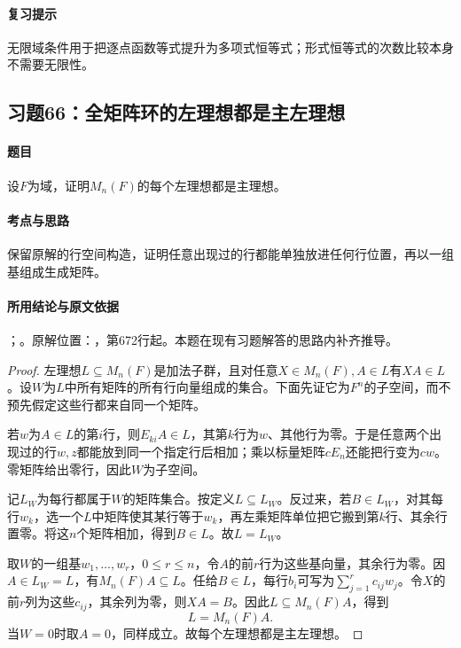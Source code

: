 \paragraph{复习提示}

无限域条件用于把逐点函数等式提升为多项式恒等式；形式恒等式的次数比较本身不需要无限性。



\subsection{习题66：全矩阵环的左理想都是主左理想}

\label{ex:3:66}

\paragraph{题目}

设$F$为域，证明$M_n(F)$的每个左理想都是主理想。

\paragraph{考点与思路}

保留原解的行空间构造，证明任意出现过的行都能单独放进任何行位置，再以一组基组成生成矩阵。

\paragraph{所用结论与原文依据}

；。原解位置：，第672行起。本题在现有习题解答的思路内补齐推导。


\begin{proof}

左理想$L\subseteq M_n(F)$是加法子群，且对任意$X\in M_n(F),A\in L$有$XA\in L$。设$W$为$L$中所有矩阵的所有行向量组成的集合。下面先证它为$F^n$的子空间，而不预先假定这些行都来自同一个矩阵。

若$w$为$A\in L$的第$i$行，则$E_{ki}A\in L$，其第$k$行为$w$、其他行为零。于是任意两个出现过的行$w,z$都能放到同一个指定行后相加；乘以标量矩阵$cE_n$还能把行变为$cw$。零矩阵给出零行，因此$W$为子空间。

记$L_W$为每行都属于$W$的矩阵集合。按定义$L\subseteq L_W$。反过来，若$B\in L_W$，对其每行$w_k$，选一个$L$中矩阵使其某行等于$w_k$，再左乘矩阵单位把它搬到第$k$行、其余行置零。将这$n$个矩阵相加，得到$B\in L$。故$L=L_W$。

取$W$的一组基$w_1,\ldots,w_r$，$0\le r\le n$，令$A$的前$r$行为这些基向量，其余行为零。因$A\in L_W=L$，有$M_n(F)A\subseteq L$。任给$B\in L$，每行$b_i$可写为$\sum_{j=1}^r c_{ij}w_j$。令$X$的前$r$列为这些$c_{ij}$，其余列为零，则$XA=B$。因此$L\subseteq M_n(F)A$，得到
\[
L=M_n(F)A.
\]
当$W=0$时取$A=0$，同样成立。故每个左理想都是主左理想。

\end{proof}

